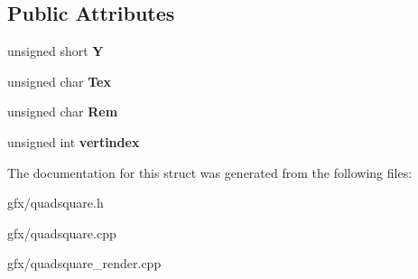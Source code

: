 \subsection*{Public Attributes}
\begin{DoxyCompactItemize}
\item 
unsigned short {\bfseries Y}\hypertarget{structVertInfo_acde369cb3b4cb963d6b3c5dca4a5ecd4}{}\label{structVertInfo_acde369cb3b4cb963d6b3c5dca4a5ecd4}

\item 
unsigned char {\bfseries Tex}\hypertarget{structVertInfo_a9667a458f17b1f2830d4870b6fafaafa}{}\label{structVertInfo_a9667a458f17b1f2830d4870b6fafaafa}

\item 
unsigned char {\bfseries Rem}\hypertarget{structVertInfo_a4d4f0ba2432c8e79b26035c8fe82a30d}{}\label{structVertInfo_a4d4f0ba2432c8e79b26035c8fe82a30d}

\item 
unsigned int {\bfseries vertindex}\hypertarget{structVertInfo_ac6ea5296771e6dd0c5a32932d66edb5e}{}\label{structVertInfo_ac6ea5296771e6dd0c5a32932d66edb5e}

\end{DoxyCompactItemize}


The documentation for this struct was generated from the following files\+:\begin{DoxyCompactItemize}
\item 
gfx/quadsquare.\+h\item 
gfx/quadsquare.\+cpp\item 
gfx/quadsquare\+\_\+render.\+cpp\end{DoxyCompactItemize}
